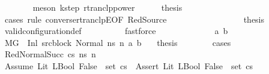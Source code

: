 \begin{isabellebody}
\ \ \ \ \ \ \isamarkupfalse%
\ {\isacharparenleft}{\kern0pt}meson\ k{\isacharunderscore}{\kern0pt}step\ rtranclp{\isacharunderscore}{\kern0pt}power{\isacharparenright}{\kern0pt}\isanewline
\ \ \ \ \isamarkupfalse%
\ {\isacharquery}{\kern0pt}thesis\isanewline
\ \ \ \ \isamarkupfalse%
\ {\isacharparenleft}{\kern0pt}cases\ rule{\isacharcolon}{\kern0pt}\ converse{\isacharunderscore}{\kern0pt}rtranclpE{}{\isacharbrackleft}{\kern0pt}OF\ RedSource{\isacharbrackright}{\kern0pt}{\isacharparenright}{\kern0pt}\isanewline
\ \ \ \ \ \ \isamarkupfalse%
\ {}\isanewline
\ \ \ \ \ \ \isamarkupfalse%
\ \isamarkupfalse%
\ {\isacharquery}{\kern0pt}thesis\isanewline
\ \ \ \ \ \ \ \ \isamarkupfalse%
\ valid{\isacharunderscore}{\kern0pt}configuration{\isacharunderscore}{\kern0pt}def\isanewline
\ \ \ \ \ \ \ \ \isamarkupfalse%
\ fastforce\isanewline
\ \ \ \ \isamarkupfalse%
\isanewline
\ \ \ \ \ \ \isamarkupfalse%
\ {\isacharparenleft}{\kern0pt}{}\ a\ b{\isacharparenright}{\kern0pt}\isanewline
\ \ \ \ \ \ \isamarkupfalse%
\ {\isacartoucheopen}M{\isacharcomma}{\kern0pt}{\isasymLambda}{\isacharcomma}{\kern0pt}{\isasymGamma}{\isacharcomma}{\kern0pt}{\isasymOmega}{\isacharcomma}{\kern0pt}G\ {\isasymturnstile}\ {\isacharparenleft}{\kern0pt}Inl\ src{\isacharunderscore}{\kern0pt}block{\isacharcomma}{\kern0pt}\ Normal\ ns{\isacharparenright}{\kern0pt}\ {\isacharminus}{\kern0pt}n{\isasymrightarrow}\ {\isacharparenleft}{\kern0pt}a{\isacharcomma}{\kern0pt}\ b{\isacharparenright}{\kern0pt}{\isacartoucheclose}\ \ \isamarkupfalse%
\ {\isacharquery}{\kern0pt}thesis\isanewline
\ \ \ \ \ \ \isamarkupfalse%
\ cases\isanewline
\ \ \ \ \ \ \ \ \isamarkupfalse%
\ {\isacharparenleft}{\kern0pt}RedNormalSucc\ cs\ ns{\isacharprime}{\kern0pt}\ n{\isacharprime}{\kern0pt}{\isacharparenright}{\kern0pt}\isanewline
\ \ \ \ \ \ \ \ \isamarkupfalse%
\ {\isachardoublequoteopen}{\isacharparenleft}{\kern0pt}Assume\ {\isacharparenleft}{\kern0pt}Lit\ {\isacharparenleft}{\kern0pt}LBool\ False{\isacharparenright}{\kern0pt}{\isacharparenright}{\kern0pt}{\isacharparenright}{\kern0pt}\ {\isasymin}\ set\ {\isacharparenleft}{\kern0pt}cs{\isacharparenright}{\kern0pt}\ {\isasymor}\ {\isacharparenleft}{\kern0pt}Assert\ {\isacharparenleft}{\kern0pt}Lit\ {\isacharparenleft}{\kern0pt}LBool\ False{\isacharparenright}{\kern0pt}{\isacharparenright}{\kern0pt}{\isacharparenright}{\kern0pt}\ {\isasymin}\ set\ {\isacharparenleft}{\kern0pt}cs{\isacharparenright}{\kern0pt}{\isachardoublequoteclose}\isanewline

\end{isabellebody}
